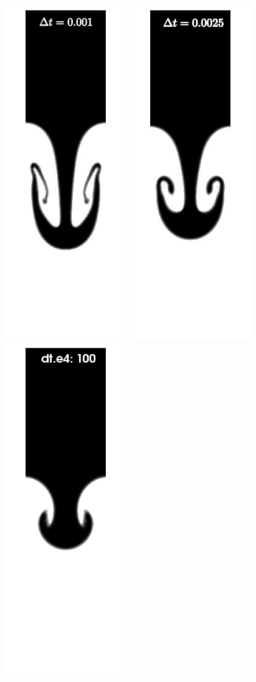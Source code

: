 \begin{figure}[htbp]
  \begin{center}

      \includegraphics[width=.24\columnwidth]{images/rayleigh_foam_dts_A.png}
      \includegraphics[width=.24\columnwidth]{images/rayleigh_foam_dts_B.png}
      \includegraphics[width=.24\columnwidth]{images/rayleigh_foam_dts_C.jpg}

\end{center}
\end{figure}
